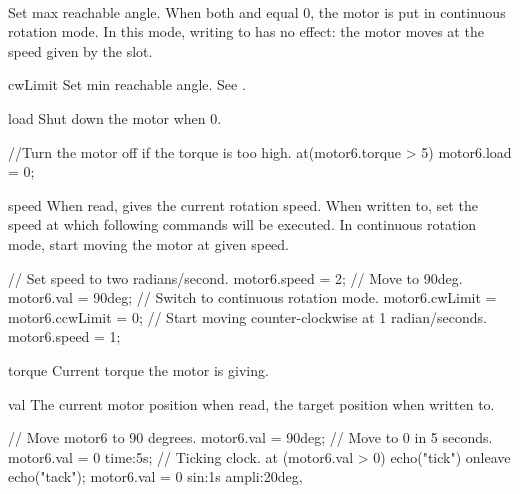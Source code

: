 \begin{urbiscriptapi}
\item {}\\
  Set max reachable angle. When both  and
   equal 0, the motor is put in continuous rotation
  mode. In this mode, writing to  has no effect: the motor
  moves at the speed given by the  slot.


\item[cwLimit] Set min reachable angle.  See .



\item[load]
  Shut down the motor when 0.

\begin{urbiunchecked}
//Turn the motor off if the torque is too high.
at(motor6.torque > 5) motor6.load = 0;
\end{urbiunchecked}


\item[speed] When read, gives the current rotation speed. When written to,
  set the speed at which following commands will be executed. In continuous
  rotation mode, start moving the motor at given speed.
\begin{urbiunchecked}
// Set speed to two radians/second.
motor6.speed = 2;
// Move to 90deg.
motor6.val = 90deg;
// Switch to continuous rotation mode.
motor6.cwLimit = motor6.ccwLimit = 0;
// Start moving counter-clockwise at 1 radian/seconds.
motor6.speed = 1;
\end{urbiunchecked}


\item[torque]
  Current torque the motor is giving.


\item[val] The current motor position when read, the target position when
  written to.

\begin{urbiunchecked}
// Move motor6 to 90 degrees.
motor6.val = 90deg;
// Move to 0 in 5 seconds.
motor6.val = 0 time:5s;
// Ticking clock.
at (motor6.val > 0) echo("tick") onleave echo("tack");
motor6.val = 0 sin:1s ampli:20deg,
\end{urbiunchecked}
\end{urbiscriptapi}

